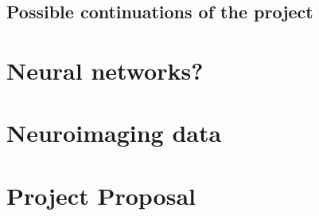 \documentclass[12pt,a4paper,twoside, openright, hidelinks]{report}
\begin{document}
\section{Possible continuations of the project}





\appendix
\chapter{Neural networks?}

\chapter{Neuroimaging data}

\chapter{Project Proposal}


\end{document}
